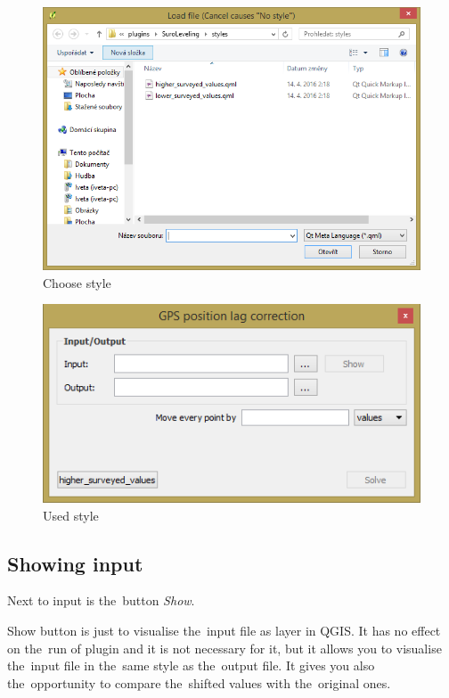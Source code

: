  \begin{figure}[H]
   \centering
	\includegraphics[scale=0.75]{./pictures/style.png}
	\caption[Choose style]{Choose style}
      \label{fig:style}
  \end{figure}

  \begin{figure}[H]
   \centering
	\includegraphics[scale=0.75]{./pictures/style-defined.png}
	\caption[Used style]{Used style}
      \label{fig:used-style}
  \end{figure}

\subsection{Showing input}
\label{show}

Next to input is the~button \textit{Show}. 

Show button is just to visualise the~input file as layer in QGIS. It has no effect on the~run of plugin
and it is not necessary for it, but it allows you to visualise the~input file in the~same style as
the~output file. It gives you also the~opportunity to compare the~shifted values with the~original ones. 

